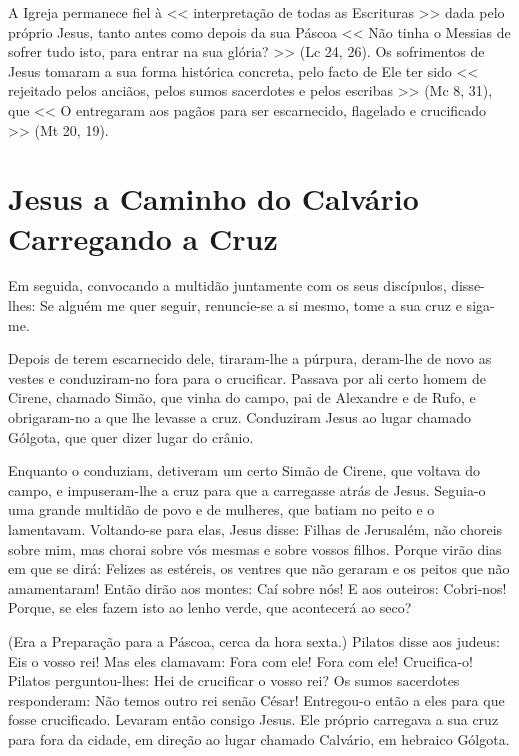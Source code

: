 \documentclass{rosario}
\begin{document}

A Igreja permanece fiel à << interpretação de todas as Escrituras >> dada pelo próprio Jesus, tanto antes como depois da sua Páscoa << Não tinha o Messias de sofrer tudo isto, para entrar na sua glória? >> (Lc 24, 26).
Os sofrimentos de Jesus tomaram a sua forma histórica concreta, pelo facto de Ele ter sido << rejeitado pelos anciãos, pelos sumos sacerdotes e pelos escribas >> (Mc 8, 31), que << O entregaram aos pagãos para ser escarnecido, flagelado e crucificado >> (Mt 20, 19).


\section{Jesus a Caminho do Calvário Carregando a Cruz}



Em seguida, convocando a multidão juntamente com os seus discípulos, disse-lhes:
Se alguém me quer seguir, renuncie-se a si mesmo, tome a sua cruz e siga-me.

Depois de terem escarnecido dele, tiraram-lhe a púrpura, deram-lhe de novo as vestes e conduziram-no fora para o crucificar.
Passava por ali certo homem de Cirene, chamado Simão, que vinha do campo, pai de Alexandre e de Rufo, e obrigaram-no a que lhe levasse a cruz.
Conduziram Jesus ao lugar chamado Gólgota, que quer dizer lugar do crânio.


Enquanto o conduziam, detiveram um certo Simão de Cirene, que voltava do campo, e impuseram-lhe a cruz para que a carregasse atrás de Jesus.
Seguia-o uma grande multidão de povo e de mulheres, que batiam no peito e o lamentavam.
Voltando-se para elas, Jesus disse:
Filhas de Jerusalém, não choreis sobre mim, mas chorai sobre vós mesmas e sobre vossos filhos.
Porque virão dias em que se dirá:
Felizes as estéreis, os ventres que não geraram e os peitos que não amamentaram!
Então dirão aos montes:
Caí sobre nós! E aos outeiros:
Cobri-nos!
Porque, se eles fazem isto ao lenho verde, que acontecerá ao seco?


(Era a Preparação para a Páscoa, cerca da hora sexta.)
Pilatos disse aos judeus:
Eis o vosso rei!
Mas eles clamavam:
Fora com ele! Fora com ele! Crucifica-o! Pilatos perguntou-lhes:
Hei de crucificar o vosso rei? Os sumos sacerdotes responderam:
Não temos outro rei senão César!
Entregou-o então a eles para que fosse crucificado.
Levaram então consigo Jesus.
Ele próprio carregava a sua cruz para fora da cidade, em direção ao lugar chamado Calvário, em hebraico Gólgota.
\end{document}
